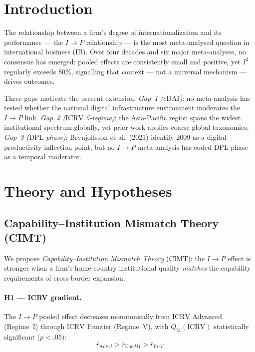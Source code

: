 \documentclass[review,authoryear]{elsarticle}
\newcommand{\rbar}{\bar{r}}                 %
\newcommand{\Isq}{I^{2}}                    %
\newcommand{\cDAI}{c\mathrm{DAI}}           %
\newcommand{\ICRV}{\mathrm{ICRV}}
\newcommand{\DPL}{\mathrm{DPL}}
\newcommand{\CIMT}{\mathrm{CIMT}}
\newcommand{\QM}{Q_{\mathrm{M}}}
\begin{document}
\section{Introduction}
\label{sec:intro}

The relationship between a firm's degree of internationalization and its
performance --- the \(I \to P\) relationship --- is the most meta-analysed
question in international business (IB).  Over four decades and six major
meta-analyses, no consensus has emerged: pooled effects are consistently small
and positive, yet \(\Isq\) regularly exceeds 80\%, signalling that context
--- not a universal mechanism --- drives outcomes.

Three gaps motivate the present extension.  \emph{Gap~1 (\(\cDAI\))}: no
meta-analysis has tested whether the national digital infrastructure environment
moderates the \(I \to P\) link.  \emph{Gap~2 (\(\ICRV\) 5-regime)}: the
Asia-Pacific region spans the widest institutional spectrum globally, yet prior
work applies coarse global taxonomies.  \emph{Gap~3 (\(\DPL\) phase)}:
Brynjolfsson et al.\ (2021) identify 2009 as a digital productivity inflection
point, but no \(I \to P\) meta-analysis has coded DPL phase as a temporal
moderator.

\section{Theory and Hypotheses}
\label{sec:theory}

\subsection{Capability--Institution Mismatch Theory (CIMT)}

We propose \emph{Capability--Institution Mismatch Theory} (\(\CIMT\)): the
\(I \to P\) effect is stronger when a firm's home-country institutional quality
\emph{matches} the capability requirements of cross-border expansion.

\paragraph{H1 --- ICRV gradient.}
The \(I \to P\) pooled effect decreases monotonically from \(\ICRV\) Advanced
(Regime~I) through \(\ICRV\) Frontier (Regime~V), with \(\QM(\ICRV)\)
statistically significant (\(p < .05\)):
\[
  \rbar_{\mathrm{Adv}\text{-}I} > \rbar_{\mathrm{Em}\text{-}III}
    > \rbar_{\mathrm{Fr}\text{-}V}
\]
\end{document}
